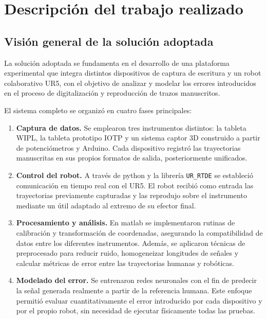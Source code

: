 \documentclass[12pt,a4paper,oneside]{report}
\begin{document}
\section{Descripción del trabajo realizado}\label{sec:trabajo-realizado}

\subsection{Visión general de la solución adoptada}

La solución adoptada se fundamenta en el desarrollo de una 
plataforma experimental que integra distintos dispositivos de 
captura de escritura y un robot colaborativo \acrshort{UR5}, con 
el objetivo de analizar y modelar los errores introducidos en el 
proceso de digitalización y reproducción de trazos manuscritos. 

El sistema completo se organizó en cuatro fases principales:

\begin{enumerate}
  \item \textbf{Captura de datos.} 
        Se emplearon tres instrumentos distintos: la tableta 
        \acrfull{WIPL}, la tableta prototipo \acrfull{IOTP} y un sistema 
        captor 3D construido a partir 
        de potenciómetros y Arduino. Cada dispositivo registró las 
        trayectorias manuscritas en sus propios formatos de salida, 
        posteriormente unificados.
  \item \textbf{Control del robot.} 
        A través de \gls{python} y la librería \texttt{UR\_RTDE} se 
        estableció comunicación en tiempo real con el 
        \acrshort{UR5}. El robot recibió como entrada las 
        trayectorias previamente capturadas y las reprodujo sobre 
        el instrumento mediante un útil adaptado al extremo de su efector 
        final.
  \item \textbf{Procesamiento y análisis.} 
        En \gls{matlab} se implementaron rutinas de calibración y 
        transformación de coordenadas, asegurando la compatibilidad 
        de datos entre los diferentes instrumentos. Además, se 
        aplicaron técnicas de preprocesado para reducir ruido, 
        homogeneizar longitudes de señales y calcular métricas de 
        error entre las trayectorias humanas y robóticas.
  \item \textbf{Modelado del error.} 
        Se entrenaron redes neuronales con el fin de predecir la 
        señal generada realmente a partir de la referencia humana. 
        Este enfoque permitió evaluar cuantitativamente el error 
        introducido por cada dispositivo y por el propio robot, sin 
        necesidad de ejecutar físicamente todas las pruebas.
\end{enumerate}
\end{document}
